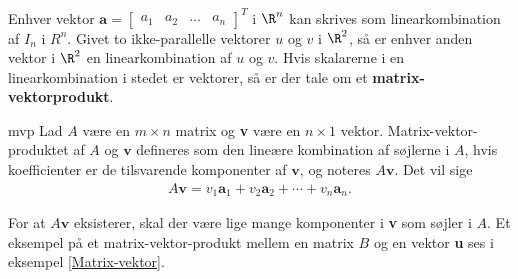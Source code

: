 %
%
Enhver vektor 
$
\textbf{a}=
\begin{bmatrix}
a_1 & a_2 & \ldots & a_n
\end{bmatrix}^T
$
i $\R^n$ kan skrives som linearkombination af $I_n$ i $R^n$. 
Givet to ikke-parallelle vektorer $u$ og $v$ i $\R^2$, så er enhver anden vektor i $\R^2$ en linearkombination af $u$ og $v$. 
Hvis skalarerne i en linearkombination i stedet er vektorer, så er der tale om et \textbf{matrix-vektorprodukt}.
%
\begin{defn}{}{mvp}
Lad $A$ være en $m \times n$ matrix og \textbf{v} være en $n \times 1$ vektor. 
Matrix-vektor-produktet af $A$ og $\textbf{v}$ defineres som den lineære kombination af søjlerne i $A$, hvis koefficienter er de tilsvarende komponenter af $\textbf{v}$, og noteres $A\textbf{v}$. 
Det vil sige
\begin{align*}
A\textbf{v} =v_1\textbf{a}_1 + v_2\textbf{a}_2 + \cdots + v_n\textbf{a}_n.
\end{align*}
\end{defn}
\noindent
For at $A\textbf{v}$ eksisterer, skal der være lige mange komponenter i \textbf{v} som søjler i $A$. 
Et eksempel på et matrix-vektor-produkt mellem en matrix $B$ og en vektor \textbf{u} ses i eksempel \ref{Matrix-vektor}.
\\
%
